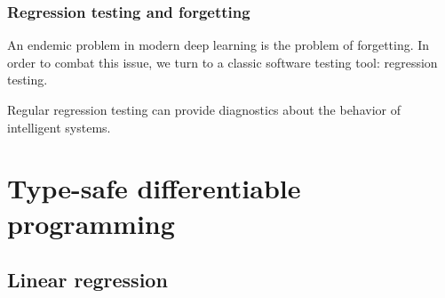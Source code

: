 \documentclass[12pt,initial,twoside,maitrise]{dms}
\numberwithin{equation}{section}
\numberwithin{table}{chapter}
\numberwithin{figure}{chapter}
\begin{document}
\subsection{Regression testing and forgetting}

An endemic problem in modern deep learning is the problem of forgetting. In order to combat this issue, we turn to a classic software testing tool: regression testing.

Regular regression testing can provide diagnostics about the behavior of intelligent systems.



%
%




\appendix
\chapter{Type-safe differentiable programming}

\section{Linear regression}
\end{document}
